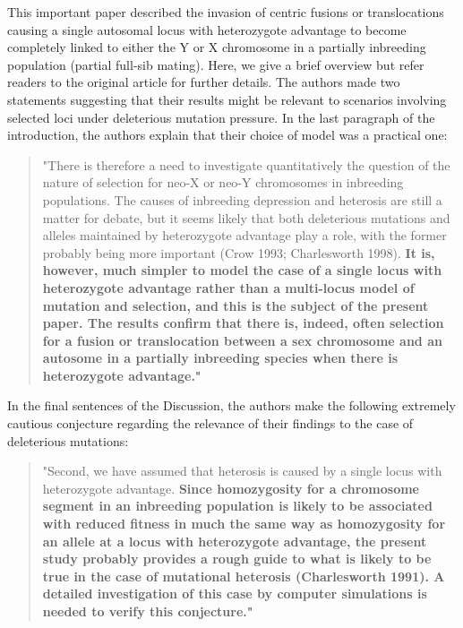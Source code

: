 \documentclass{article}
\begin{document}
\begin{appendices}
 This important paper described the invasion of centric fusions or translocations causing a single autosomal locus with heterozygote advantage to become completely linked to either the Y or X chromosome in a partially inbreeding population (partial full-sib mating). Here, we give a brief overview but refer readers to the original article for further details. The authors made two statements suggesting that their results might be relevant to scenarios involving selected loci under deleterious mutation pressure. In the last paragraph of the introduction, the authors explain that their choice of model was a practical one:

	\begin{quote}
		"There is therefore a need to investigate quantitatively the question of the nature of selection for neo-X or neo-Y chromosomes in inbreeding populations. The causes of inbreeding depression and heterosis are still a matter for debate, but it seems likely that both deleterious mutations and alleles maintained by heterozygote advantage play a role, with the former probably being more important (Crow 1993; Charlesworth 1998). \bf{It is, however, much simpler to model the case of a single locus with heterozygote advantage rather than a multi-locus model of mutation and selection, and this is the subject of the present paper}. The results confirm that there is, indeed, often selection for a fusion or translocation between a sex chromosome and an autosome in a partially inbreeding species when there is heterozygote advantage."
	\end{quote}

\noindent In the final sentences of the Discussion, the authors make the following extremely cautious conjecture regarding the relevance of their findings to the case of deleterious mutations:

	\begin{quote}
		"Second, we have assumed that heterosis is caused by a single locus with heterozygote advantage. \bf{Since homozygosity for a chromosome segment in an inbreeding population is likely to be associated with reduced fitness in much the same way as homozygosity for an allele at a locus with heterozygote advantage, the present study probably provides a rough guide to what is likely to be true in the case of mutational heterosis (Charlesworth 1991). A detailed investigation of this case by computer simulations is needed to verify this conjecture}."
	\end{quote}


\end{appendices}
\end{document}
